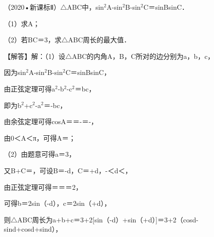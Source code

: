 \begin{question}
（2020•新课标Ⅱ）$\triangle$ABC中，sin$^{2}$A-sin$^{2}$B-sin$^{2}$C＝sinBsinC．\par
（1）求A；\par
（2）若BC＝3，求$\triangle$ABC周长的最大值．\par
\begin{solution}
【解答】解：（1）设$\triangle$ABC的内角A，B，C所对的边分别为a，b，c，\par
因为sin$^{2}$A-sin$^{2}$B-sin$^{2}$C＝sinBsinC，\par
由正弦定理可得a$^{2}$-b$^{2}$-c$^{2}$＝bc，\par
即为b$^{2}$+c$^{2}$-a$^{2}$＝-bc，\par
由余弦定理可得cosA＝\allowbreak{}＝-\allowbreak{}＝-\allowbreak{}，\par
由0＜A＜π，可得A＝\allowbreak{}；\par
（2）由题意可得a＝3，\par
又B+C＝\allowbreak{}，可设B＝\allowbreak{}-d，C＝\allowbreak{}+d，-\allowbreak{}＜d＜\allowbreak{}，\par
由正弦定理可得\allowbreak{}＝\allowbreak{}＝\allowbreak{}＝2\allowbreak{}，\par
可得b＝2\allowbreak{}sin（\allowbreak{}-d），c＝2\allowbreak{}sin（\allowbreak{}+d），\par
则$\triangle$ABC周长为a+b+c＝3+2\allowbreak{}[sin（\allowbreak{}-d）+sin（\allowbreak{}+d）]＝3+2\allowbreak{}（\allowbreak{}cosd-\allowbreak{}sind+\allowbreak{}cosd+\allowbreak{}sind），\par

\end{solution}
\end{question}
